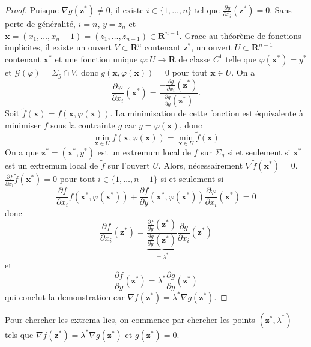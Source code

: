 \begin{proof}
Puisque $\nabla g(\boldsymbol{z}^{*})\neq0$, il existe $i\in \{ 1,\dots,n \}$ tel que $\frac{ \partial g }{ \partial x_{i} }(\boldsymbol{z}^{*})=0$. Sans perte de généralité, $i=n$, $y=z_{n}$ et $\boldsymbol{x}=(x_{1},\dots,x_{n}-1)=(z_{1},\dots,z_{n-1})\in \mathbf{R}^{n-1}$. Grace au théorème de fonctions implicites, il existe un ouvert $V\subset \mathbf{R}^{n}$ contenant $\boldsymbol{z}^{*}$, un ouvert $U\subset \mathbf{R}^{n-1}$ contenant $\boldsymbol{x}^{*}$ et une fonction unique $\varphi:U\to \mathbf{R}$ de classe $C^{1}$ telle que $\varphi(\boldsymbol{x}^{*})=y^{*}$ et $\mathcal{G}(\varphi)=\Sigma _{g}\cap V$, donc $g(\boldsymbol{x},\varphi(\boldsymbol{x}))=0$ pour tout $\boldsymbol{x}\in U$. On a
$$
\frac{ \partial \varphi }{ \partial x_{i} } (\boldsymbol{x}^{*})=\frac{-\frac{ \partial g }{ \partial x_{i} } (\boldsymbol{z}^{*})}{\frac{ \partial g }{ \partial y } (\boldsymbol{z}^{*})}.
$$
Soit $\tilde{f}(\boldsymbol{x})=f(\boldsymbol{x},\varphi(\boldsymbol{x}))$. La minimisation de cette fonction est équivalente à minimiser $f$ sous la contrainte $g$ car $y=\varphi(\boldsymbol{x})$, donc 
$$
\min_{\boldsymbol{x}\in U}f(\boldsymbol{x},\varphi(\boldsymbol{x}))=\min_{\boldsymbol{x}\in U} \tilde{f}(\boldsymbol{x})
$$
On a que $\boldsymbol{z}^{*}=(\boldsymbol{x}^{*},y^{*})$ est un extremum local de $f$ sur $\Sigma _{g}$ si et seulement si $\boldsymbol{x}^{*}$ est un extremum local de $\tilde{f}$ sur l'ouvert $U$. Alors, nécessairement $\nabla \tilde{f}(\boldsymbol{x}^{*})=0$. $\frac{ \partial f }{ \partial x_{i} }\tilde{f}(\boldsymbol{x}^{*})=0$ pour tout $i\in \{ 1,\dots,n-1 \}$ si et seulement si $$\frac{ \partial f }{ \partial x_{i} }f(\boldsymbol{x}^{*},\varphi(\boldsymbol{x}^{*}))+\frac{ \partial f }{ \partial y }(\boldsymbol{x}^{*},\varphi(\boldsymbol{x}^{*}))\frac{ \partial \varphi }{ \partial x_{i} }(\boldsymbol{x}^{*})=0$$ donc
$$
\frac{ \partial f }{ \partial x_{i} } (\boldsymbol{z}^{*})=\underbrace{ \frac{\frac{ \partial f }{ \partial y } (\boldsymbol{z}^{*})}{\frac{ \partial g }{ \partial y } (\boldsymbol{z}^{*})} }_{ =\lambda ^{*} }  \frac{ \partial g }{ \partial x_{i} } (\boldsymbol{z}^{*})
$$
et
$$
\frac{ \partial f}{ \partial y } (\boldsymbol{z}^{*})=\lambda ^{*}\frac{ \partial g }{ \partial y } (\boldsymbol{z}^{*})
$$
qui conclut la demonstration car $\nabla f(\boldsymbol{z}^{*})=\lambda ^{*}\nabla g(\boldsymbol{z}^{*})$. 
\end{proof}

Pour chercher les extrema lies, on commence par chercher les points $(\boldsymbol{z}^{*},\lambda ^{*})$ tels que $\nabla f(\boldsymbol{z}^{*})=\lambda ^{*}\nabla g(\boldsymbol{z}^{*})$ et $g(\boldsymbol{z}^{*})=0$.

